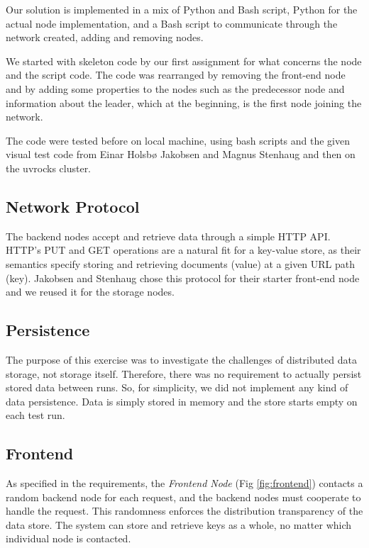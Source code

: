 \documentclass[11pt,conference]{IEEEtran}
\begin{document}
Our solution is implemented in a mix of Python and Bash script, Python for the
actual node implementation, and a Bash script to communicate through the network created, adding and removing nodes.

We started with skeleton code by our first assignment for what concerns the node and the script code. 
The code was rearranged by removing the front-end node and by adding some properties to the nodes such as the predecessor node and information about the leader, which at the beginning, is the first node joining the network.

The code were tested before on local machine, using bash scripts and the given visual test code from Einar Holsbø Jakobsen and Magnus Stenhaug and then on the uvrocks cluster.

\subsection{Network Protocol}

The backend nodes accept and retrieve data through a simple HTTP API. HTTP's PUT
and GET operations are a natural fit for a key-value store, as their semantics
specify storing and retrieving documents (value) at a given URL path (key).
Jakobsen and Stenhaug chose this protocol for their starter front-end node and
we reused it for the storage nodes.


\subsection{Persistence}

The purpose of this exercise was to investigate the challenges of distributed
data storage, not storage itself. Therefore, there was no requirement to
actually persist stored data between runs. So, for simplicity, we did not
implement any kind of data persistence. Data is simply stored in memory and the
store starts empty on each test run.


\subsection{Frontend}

As specified in the requirements, the \textit{Frontend Node} (Fig
\ref{fig:frontend}) contacts a random backend node for each request, and the
backend nodes must cooperate to handle the request. This randomness enforces the
distribution transparency of the data store. The system can store and retrieve
keys as a whole, no matter which individual node is contacted.
\end{document}
